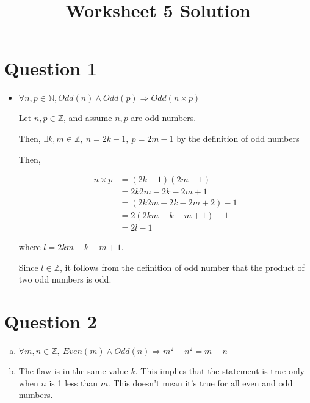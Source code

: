 \documentclass[12pt]{article}
\begin{document}
\title{Worksheet 5 Solution}
\maketitle

\section*{Question 1}
\begin{itemize}
    \item

    $\forall n,p \in \mathbb{N}, Odd(n) \land Odd(p) \Rightarrow Odd(n \times p)$

    \bigskip

    Let $n,p \in \mathbb{Z}$, and assume $n,p$ are odd numbers.

    \bigskip

    Then, $\exists k,m \in \mathbb{Z},\:n = 2k - 1,\: p = 2m -1$ by the definition of
    odd numbers

    \bigskip

    Then,

    \begin{align}
        n \times p &= (2k-1)(2m-1)\\
        &= 2k2m - 2k - 2m + 1 \\
        &=(2k2m - 2k - 2m + 2) - 1 \\
        &=2(2km - k - m + 1) - 1\\
        &=2l - 1
    \end{align}

    where $l = 2km - k - m + 1$.

    \bigskip

    Since $l \in \mathbb{Z}$, it follows from the definition of odd number that the product
    of two odd numbers is odd.

\end{itemize}

\section*{Question 2}

\begin{enumerate}[a.]
    \item

    $\forall m,n \in \mathbb{Z},\:Even(m) \land Odd(n) \Rightarrow m^2-n^2 = m + n$

    \item

    The flaw is in the same value $k$. This implies that the statement is true
    only when $n$ is 1 less than $m$. This doesn't mean it's true for all even and
    odd numbers.


\end{enumerate}
\end{document}
